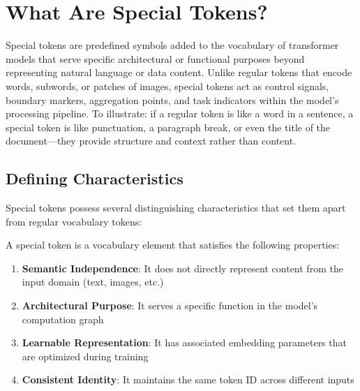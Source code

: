 \section{What Are Special Tokens?}

Special tokens are predefined symbols added to the vocabulary of transformer models that serve specific architectural or functional purposes beyond representing natural language or data content. Unlike regular tokens that encode words, subwords, or patches of images, special tokens act as control signals, boundary markers, aggregation points, and task indicators within the model's processing pipeline. To illustrate: if a regular token is like a word in a sentence, a special token is like punctuation, a paragraph break, or even the title of the document—they provide structure and context rather than content.
\begin{comment}
Feedback: This is a good, dense definition. To make it more accessible, you could use an analogy. For example: "If a regular token is like a word in a sentence, a special token is like punctuation, a paragraph break, or even the title of the document. They provide structure and context rather than content."

STATUS: addressed - added analogy comparing special tokens to punctuation and document structure elements
\end{comment}

\subsection{Defining Characteristics}

Special tokens possess several distinguishing characteristics that set them apart from regular vocabulary tokens:

\begin{definition}
A special token is a vocabulary element that satisfies the following properties:
\begin{enumerate}
\item \textbf{Semantic Independence}: It does not directly represent content from the input domain (text, images, etc.)
\item \textbf{Architectural Purpose}: It serves a specific function in the model's computation graph
\item \textbf{Learnable Representation}: It has associated embedding parameters that are optimized during training
\item \textbf{Consistent Identity}: It maintains the same token ID across different inputs
\end{enumerate}
\end{definition}

